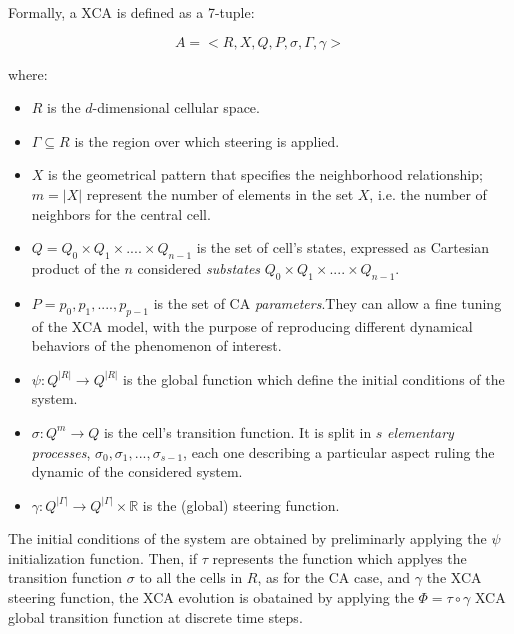     Formally, a XCA is defined as a 7-tuple:

    $$ A = <R,X,Q,P,\sigma,\Gamma,\gamma>$$

    \noindent where:

    \begin{itemize}

    \item $R$ is the $d$-dimensional cellular space.

    \item $\Gamma \subseteq R$ is the region over which steering is applied.

    \item $X$ is the geometrical pattern that specifies the neighborhood
      relationship; $m = |X|$ represent the number of elements in the set
      $X$, i.e. the number of neighbors for the central cell.

    \item $Q = Q_0 \times Q_1 \times....\times Q_{n-1}$ is the set of
      cell's states, expressed as Cartesian product of the $n$ considered
      \emph{substates} $Q_0 \times Q_1 \times....\times Q_{n-1}$.

    \item $P = {p_0,p_1,....,p_{p-1}}$ is the set of CA
      \emph{parameters}.They can allow a fine tuning of the XCA model,
      with the purpose of reproducing different dynamical behaviors of
      the phenomenon of interest.

    \item $\psi : Q^{|R|} \rightarrow Q^{|R|}$ is the global function
      which define the initial conditions of the system.
      
    \item $\sigma : Q^m \rightarrow Q$ is the cell's transition function.
      It is split in $s$ \emph{elementary processes}, $\sigma_0,\sigma_1,
      ..., \sigma_{s-1}$, each one describing a particular aspect ruling
      the dynamic of the considered system.

    \item $\gamma: Q^{|\Gamma|} \rightarrow Q^{|\Gamma|} \times
      \mathbb{R}$ is the (global) steering function.

    \end{itemize}

    The initial conditions of the system are obtained by preliminarly
    applying the $\psi$ initialization function. Then, if $\tau$
    represents the function which applyes the transition function
    $\sigma$ to all the cells in $R$, as for the CA case, and $\gamma$
    the XCA steering function, the XCA evolution is obatained by
    applying the $\Phi = \tau \circ \gamma$ XCA global transition
    function at discrete time steps.

